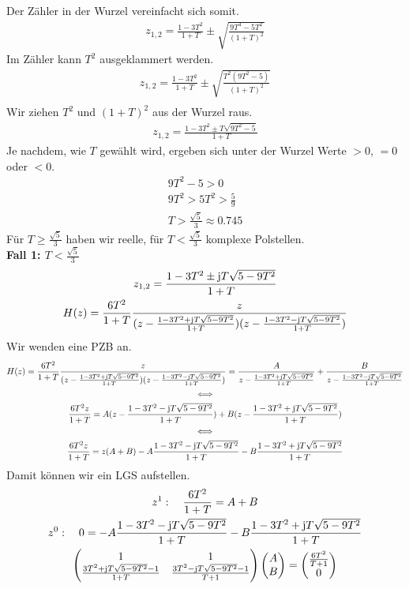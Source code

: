 \documentclass[11pt,a4paper,DIV=12]{scrartcl}
\begin{document}
Der Zähler in der Wurzel vereinfacht sich somit.
\begin{gather}
	z_{1,2}=\frac{1-3T^2}{1+T}\pm\sqrt{\frac{9T^4-5T^2}{(1+T)^2}}
\end{gather}
Im Zähler kann $T^2$ ausgeklammert werden.
\begin{gather}
	z_{1,2}=\frac{1-3T^2}{1+T}\pm\sqrt{\frac{T^2(9T^2-5)}{(1+T)^2}}\\
\end{gather}
Wir ziehen $T^2$ und $(1+T)^2$ aus der Wurzel raus.
\begin{gather}
	z_{1,2}=\frac{1-3T^2\pm T\sqrt{9T^2-5}}{1+T}
\end{gather}
Je nachdem, wie $T$ gewählt wird, ergeben sich unter der Wurzel Werte $>0$, $=0$ oder $<0$.
\begin{gather}
	9T^2-5>0\\
	9T^2>5
	T^2>\frac{5}{9}\\
	T>\frac{\sqrt{5}}{3}\approx0.745
\end{gather}
Für $T\geq\frac{\sqrt{5}}{3}$ haben wir reelle, für $T<\frac{\sqrt{5}}{3}$ komplexe Polstellen.\\
\textbf{Fall 1: $T<\frac{\sqrt{5}}{3}$}
\begin{gather}
	z_{1,2}=\frac{1-3T^2\pm \im T\sqrt{5-9T^2}}{1+T}\\
	H(z)=\frac{6T^2}{1+T}\frac{z}{(z-\frac{1-3T^2+\im T\sqrt{5-9T^2}}{1+T})(z-\frac{1-3T^2-\im T\sqrt{5-9T^2}}{1+T})}
\end{gather}
Wir wenden eine PZB an.
\begin{gather}
	H(z)=\frac{6T^2}{1+T}\frac{z}{(z-\frac{1-3T^2+\im T\sqrt{5-9T^2}}{1+T})(z-\frac{1-3T^2-\im T\sqrt{5-9T^2}}{1+T})}=\frac{A}{z-\frac{1-3T^2+\im T\sqrt{5-9T^2}}{1+T}}+\frac{B}{z-\frac{1-3T^2-\im T\sqrt{5-9T^2}}{1+T}}\\
	\Longleftrightarrow\nonumber\\
	\frac{6T^2z}{1+T}=A(z-\frac{1-3T^2-\im T\sqrt{5-9T^2}}{1+T})+B(z-\frac{1-3T^2+\im T\sqrt{5-9T^2}}{1+T})\\
	\Longleftrightarrow\nonumber\\
	\frac{6T^2z}{1+T}=z(A+B)-A\frac{1-3T^2-\im T\sqrt{5-9T^2}}{1+T}-B\frac{1-3T^2+\im T\sqrt{5-9T^2}}{1+T}\\
\end{gather}
Damit können wir ein LGS aufstellen.
\begin{gather}
	z^1:\quad\frac{6T^2}{1+T}=A+B\\
	z^0:\quad0=-A\frac{1-3T^2-\im T\sqrt{5-9T^2}}{1+T}-B\frac{1-3T^2+\im T\sqrt{5-9T^2}}{1+T}\\
	\begin{pmatrix}
		1 & 1 \\
		\frac{3T^2+\im T\sqrt{5-9T^2}-1}{1+T} & \frac{3T^2-\im T \sqrt{5-9T^2}-1}{T+1}
	\end{pmatrix}
	\begin{pmatrix}
		A \\
		B
	\end{pmatrix}
	=
	\begin{pmatrix}
		\frac{6T^2}{T+1}\\
		0
	\end{pmatrix}
\end{gather}
\end{document}
